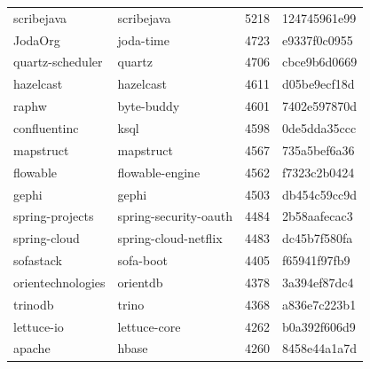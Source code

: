 \begin{longtable}{l | l | l | l}
    scribejava          & scribejava                & 5218  & 124745961e99                            \\
    JodaOrg             & joda-time                 & 4723  & e9337f0c0955                            \\
    quartz-scheduler    & quartz                    & 4706  & cbce9b6d0669                            \\
    hazelcast           & hazelcast                 & 4611  & d05be9ecf18d                            \\
    raphw               & byte-buddy                & 4601  & 7402e597870d                            \\
    confluentinc        & ksql                      & 4598  & 0de5dda35ccc                            \\
    mapstruct           & mapstruct                 & 4567  & 735a5bef6a36                            \\
    flowable            & flowable-engine           & 4562  & f7323c2b0424                            \\
    gephi               & gephi                     & 4503  & db454c59cc9d                            \\
    spring-projects     & spring-security-oauth     & 4484  & 2b58aafecac3                            \\
    spring-cloud        & spring-cloud-netflix      & 4483  & dc45b7f580fa                            \\
    sofastack           & sofa-boot                 & 4405  & f65941f97fb9                            \\
    orientechnologies   & orientdb                  & 4378  & 3a394ef87dc4                            \\
    trinodb             & trino                     & 4368  & a836e7c223b1                            \\
    lettuce-io          & lettuce-core              & 4262  & b0a392f606d9                            \\
    apache              & hbase                     & 4260  & 8458e44a1a7d                            \\
\end{longtable}
